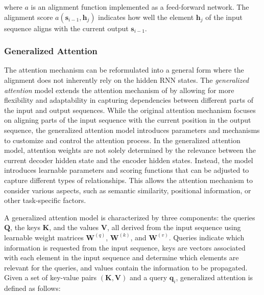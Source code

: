 
\noindent where $a$ is an alignment function implemented as a feed-forward network. The alignment score $a(\bm{s}_{i-1}, \bm{h}_j)$ indicates how well the element $\bm{h}_j$ of the input sequence aligns with the current output $\bm{s}_{i-1}$.

\subsubsection{Generalized Attention} 

The attention mechanism can be reformulated into a general form where the alignment does not inherently rely on the hidden \ac{RNN} states. The \textit{generalized attention} model \citep{chaudhari2021attentive} extends the attention mechanism of \citet{bahdanau2014neural} by allowing for more flexibility and adaptability in capturing dependencies between different parts of the input and output sequences. While the original attention mechanism focuses on aligning parts of the input sequence with the current position in the output sequence, the generalized attention model introduces parameters and mechanisms to customize and control the attention process. In the generalized attention model, attention weights are not solely determined by the relevance between the current decoder hidden state and the encoder hidden states. Instead, the model introduces learnable parameters and scoring functions that can be adjusted to capture different types of relationships. This allows the attention mechanism to consider various aspects, such as semantic similarity, positional information, or other task-specific factors.

A generalized attention model is characterized by three components: the queries $\bm{Q}$, the keys $\bm{K}$, and the values $\bm{V}$, all derived from the input sequence using learnable weight matrices $\bm{W}^{(q)}$, $\bm{W}^{(k)}$, and $\bm{W}^{(v)}$. Queries indicate which information is requested from the input sequence, keys are vectors associated with each element in the input sequence and determine which elements are relevant for the queries, and values contain the information to be propagated. Given a set of key-value pairs $(\bm{K}, \bm{V})$ and a query $\bm{q}_i$, generalized attention is defined as follows:

